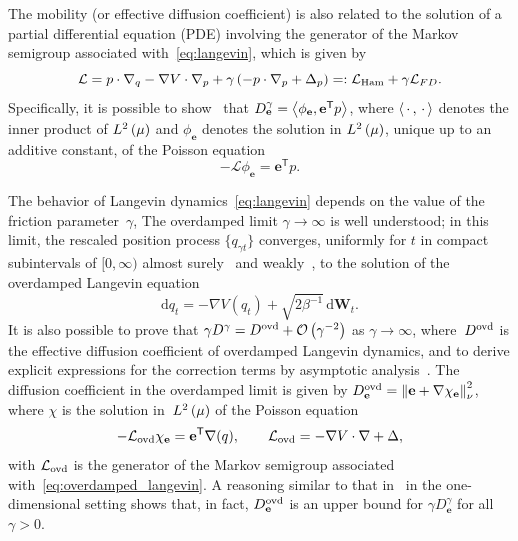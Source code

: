\documentclass[11pt,a4paper]{article}
\newcommand{\laplacian}{\Delta}
\newcommand{\dummy}{\,\cdot\,}
\newcommand{\grad}{\nabla}
\newcommand{\vect}[1]{\boldsymbol{\mathbf #1}}
\renewcommand{\d}{\mathrm d}
\renewcommand{\t}{\mathsf T}
\theoremstyle{plain}
\numberwithin{equation}{section}
\begin{document}
The mobility (or effective diffusion coefficient)
is also related to the solution of a partial differential equation (PDE) involving the generator of the Markov semigroup associated with~\eqref{eq:langevin},
which is given by
\begin{equation}
    \label{eq:decomposition_generator}
    \mathcal L
    = p \cdot \grad_q - \grad V \cdot \grad_p + \gamma \left( - p \cdot \grad_p + \laplacian_p \right)
    =: \mathcal L_{\rm Ham} + \gamma \mathcal L_{FD}.
\end{equation}
Specifically, it is possible to  show~\cite{pavliotis2008multiscale,MR3509213} that $D^{\gamma}_{\vect e} = \ip{\phi_{\vect e}}{\vect e^\t p}$,
where $\ip{\dummy}{\dummy}$ denotes the inner product of $\lp{2}{\mu}$ and $\phi_{\vect e}$ denotes the solution in $\lp{2}{\mu}$,
unique up to an additive constant,
of the Poisson equation
\begin{equation}
    \label{eq:poisson_equation}
    - \mathcal L \phi_{\vect e} = \vect e^\t p.
\end{equation}

The behavior of Langevin dynamics~\eqref{eq:langevin} depends on the value of the friction parameter~$\gamma$,
The overdamped limit $\gamma \to \infty$ is well understood;
in this limit, the rescaled position process $\{q_{\gamma t}\}$
converges, uniformly for $t$ in compact subintervals of $[0, \infty)$ almost surely~\cite{MR0214150} and weakly~\cite{MR4054345},
to the solution of the overdamped Langevin equation
\begin{equation}
    \label{eq:overdamped_langevin}
    \d q_t = - \grad V(q_t) + \sqrt{2 \beta^{-1}} \, \d \vect W_t.
\end{equation}
It is also possible to prove that $\gamma D^{\gamma} = D^{\rm ovd} + \bigo{\gamma^{-2}}$ as $\gamma \to \infty$,
where~$D^{\rm ovd}$ is the effective diffusion coefficient of overdamped Langevin dynamics,
and to derive explicit expressions for the correction terms by asymptotic analysis~\cite{MR2394704}.
The diffusion coefficient in the overdamped limit is given by $D^{\rm ovd}_{\vect e} = \norm{\vect e + \grad \chi_{\vect e}}[\nu]^2$,
where $\chi$ is the solution in~$\lp{2}{\mu}$ of the Poisson equation
\[
    - \mathcal L_{\rm ovd} \chi_{\vect e} = \vect e^\t \grad(q), \qquad \mathcal L_{\rm ovd} = - \grad V \cdot \grad + \laplacian,
\]
with $\mathcal L_{\rm ovd}$ is the generator of the Markov semigroup associated with~\eqref{eq:overdamped_langevin}.
A reasoning similar to that in~\cite[Proposition 4.1]{MR2394704} in the one-dimensional setting shows that,
in fact, $D^{\rm ovd}_{\vect e}$ is an upper bound for $\gamma D^{\gamma}_{\vect e}$ for all $\gamma > 0$.
\end{document}
